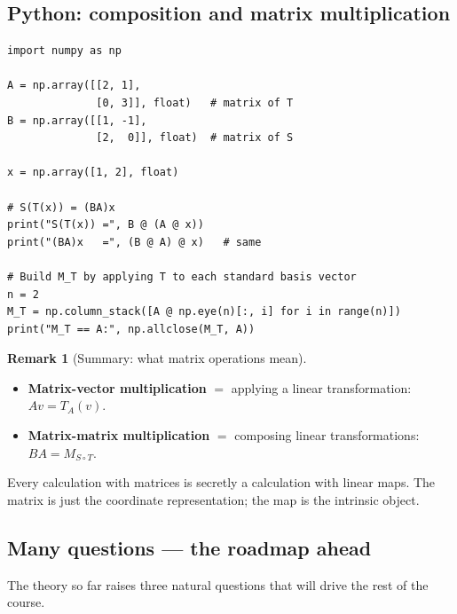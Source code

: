 \documentclass[11pt]{article}
\theoremstyle{definition}
\newtheorem{remark}{Remark}[section]
\theoremstyle{plain}
\begin{document}
\subsection{Python: composition and matrix multiplication}
\begin{lstlisting}
import numpy as np

A = np.array([[2, 1],
              [0, 3]], float)   # matrix of T
B = np.array([[1, -1],
              [2,  0]], float)  # matrix of S

x = np.array([1, 2], float)

# S(T(x)) = (BA)x
print("S(T(x)) =", B @ (A @ x))
print("(BA)x   =", (B @ A) @ x)   # same

# Build M_T by applying T to each standard basis vector
n = 2
M_T = np.column_stack([A @ np.eye(n)[:, i] for i in range(n)])
print("M_T == A:", np.allclose(M_T, A))
\end{lstlisting}

\begin{remark}[Summary: what matrix operations mean]
  \leavevmode
  \begin{itemize}
    \item \textbf{Matrix-vector multiplication} $=$ applying a linear
          transformation: $Av = T_A(v)$.
    \item \textbf{Matrix-matrix multiplication} $=$ composing linear
          transformations: $BA = M_{S\circ T}$.
  \end{itemize}
  Every calculation with matrices is secretly a calculation with linear
  maps.  The matrix is just the coordinate representation; the map is
  the intrinsic object.
\end{remark}

\subsection{Many questions --- the roadmap ahead}

The theory so far raises three natural questions that will drive the
rest of the course.
\end{document}
